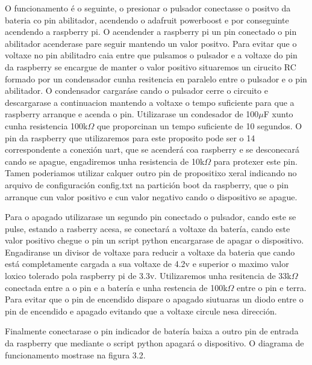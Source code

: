 \begin{itemize}
    O funcionamento é o seguinte, o presionar o pulsador conectasse o positvo da bateria co pin abilitador, acendendo o adafruit powerboost e por conseguinte acendendo a raspberry pi. O acendender a raspberry pi un pin conectado o pin abilitador acenderase pare seguir mantendo un valor positvo. Para evitar que o voltaxe no pin abilitadro caia entre que pulsamos o pulsador e a voltaxe do pin da raspberry se encargue de manter o valor positivo situaremos un cirucito RC formado por un condensador cunha resitencia en paralelo entre o pulsador e o pin abilitador. O condensador cargaráse cando o pulsador cerre o circuito e descargarase a continuacion mantendo a voltaxe o tempo suficiente para que a raspberry arranque e acenda o pin. Utilizarase un condesador de 100\(\mu\)F xunto cunha resistencia 100k\(\Omega\) que proporcinan un tempo suficiente de 10 segundos. O pin da raspberry que utilizaremos para este proposito pode ser o 14 correspondente a conexión uart, que se acenderá coa raspberry e se desconecará cando se apague, engadiremos unha resistencia de 10k\(\Omega\) para protexer este pin. Tamen poderiamos utilizar calquer outro pin de propositixo xeral indicando no arquivo de configuración config.txt na partición boot da raspberry, que o pin arranque cun valor positivo e cun valor negativo cando o dispositivo se apague.

    Para o apagado utilizarase un segundo pin conectado o pulsador, cando este se pulse, estando a rasberry acesa, se conectará a voltaxe da batería, cando este valor positivo chegue o pin un script python encargarase de apagar o dispositivo. Engadiranse un divisor de voltaxe para reducir a voltaxe da bateria que cando está completamente cargada a sua voltaxe de 4.2v e superior o maximo valor loxico tolerado pola raspberry pi de 3.3v. Utilizaremos unha resitencia de 33k\(\Omega\) conectada entre a o pin e a batería e unha restencia de 100k\(\Omega\) entre o pin e terra. Para evitar que o pin de encendido dispare o apagado siutuaras un diodo entre o pin de encendido e apagado evitando que a voltaxe circule nesa dirección.

    Finalmente conectarase o pin indicador de batería baixa a outro pin de entrada da raspberry que mediante o script python apagará o dispositivo. O diagrama de funcionamento mostrase na figura 3.2.


\end{itemize}
